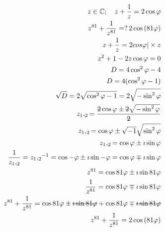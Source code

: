 \documentclass{article}
\newcommand{\stkout}[1]{\ifmmode\text{\sout{\ensuremath{#1}}}\else\sout{#1}\fi}
\begin{document}
    \begin{align*}
        z \in \mathbb{C};\quad z + \frac{1}{z} = 2\cos\varphi\\
        z ^ {81} + \frac{1}{z ^ {81}} =?\, 2\cos{(81\varphi)}\\
        z + \frac{1}{z} = 2cos\varphi| \times z\\
        z^2 + 1 -2z\cos\varphi = 0\\
        D = 4\cos^2\varphi -4\\
        D = 4(\cos^2\varphi - 1)\\
        \sqrt{D} = 2\sqrt{\cos^2\varphi - 1} = 2\sqrt{-\sin^2\varphi}\\
        z_1,_2 = \frac{\stkout{2}\cos\varphi \pm \stkout{2}\sqrt{-\sin^2\varphi}}{\stkout{2}}\\
        z_1,_2 = \cos\varphi \pm \sqrt{-1}\sqrt{\sin^2\varphi}\\
        z_1,_2 = \cos\varphi \pm \imath\sin\varphi\\
        \frac{1}{z_1,_2} = {z_1,_2} ^{-1} = \cos{-\varphi} \pm \imath\sin{-\varphi} = \cos\varphi \mp \imath\sin\varphi\\
        z^{81} = \cos{81\varphi} \pm \imath\sin{81\varphi}\\
        \frac{1}{z^{81}} = \cos{81\varphi} \mp \imath\sin{81\varphi}\\
        z^{81} + \frac{1}{z^{81}} = \cos{81\varphi} \pm \stkout{\imath\sin{81\varphi}} + \cos{81\varphi} \mp \stkout{\imath\sin{81\varphi}}\\
        z ^ {81} + \frac{1}{z ^ {81}} = 2\cos{(81\varphi)}
    \end{align*}
\end{document}
